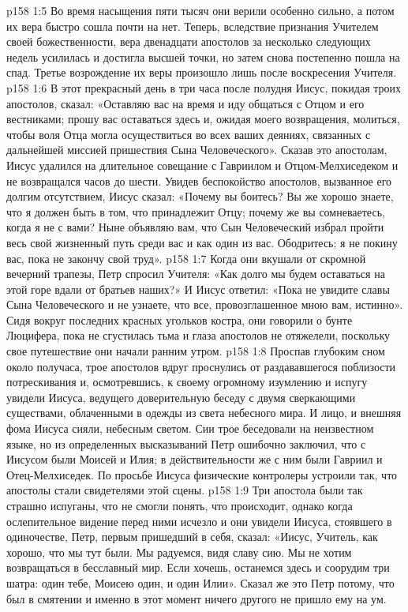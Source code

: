 \vs p158 1:5 Во время насыщения пяти тысяч они верили особенно сильно, а потом их вера быстро сошла почти на нет. Теперь, вследствие признания Учителем своей божественности, вера двенадцати апостолов за несколько следующих недель усилилась и достигла высшей точки, но затем снова постепенно пошла на спад. Третье возрождение их веры произошло лишь после воскресения Учителя.
\vs p158 1:6 В этот прекрасный день в три часа после полудня Иисус, покидая троих апостолов, сказал: «Оставляю вас на время и иду общаться с Отцом и его вестниками; прошу вас оставаться здесь и, ожидая моего возвращения, молиться, чтобы воля Отца могла осуществиться во всех ваших деяниях, связанных с дальнейшей миссией пришествия Сына Человеческого». Сказав это апостолам, Иисус удалился на длительное совещание с Гавриилом и Отцом\hyp{}Мелхиседеком и не возвращался часов до шести. Увидев беспокойство апостолов, вызванное его долгим отсутствием, Иисус сказал: «Почему вы боитесь? Вы же хорошо знаете, что я должен быть в том, что принадлежит Отцу; почему же вы сомневаетесь, когда я не с вами? Ныне объявляю вам, что Сын Человеческий избрал пройти весь свой жизненный путь среди вас и как один из вас. Ободритесь; я не покину вас, пока не закончу свой труд».
\vs p158 1:7 Когда они вкушали от скромной вечерний трапезы, Петр спросил Учителя: «Как долго мы будем оставаться на этой горе вдали от братьев наших?» И Иисус ответил: «Пока не увидите славы Сына Человеческого и не узнаете, что все, провозглашенное мною вам, истинно». Сидя вокруг последних красных угольков костра, они говорили о бунте Люцифера, пока не сгустилась тьма и глаза апостолов не отяжелели, поскольку свое путешествие они начали ранним утром.
\vs p158 1:8 Проспав глубоким сном около получаса, трое апостолов вдруг проснулись от раздававшегося поблизости потрескивания и, осмотревшись, к своему огромному изумлению и испугу увидели Иисуса, ведущего доверительную беседу с двумя сверкающими существами, облаченными в одежды из света небесного мира. И лицо, и внешняя фома Иисуса сияли, небесным светом. Сии трое беседовали на неизвестном языке, но из определенных высказываний Петр ошибочно заключил, что с Иисусом были Моисей и Илия; в действительности же с ним были Гавриил и Отец\hyp{}Мелхиседек. По просьбе Иисуса физические контролеры устроили так, что апостолы стали свидетелями этой сцены.
\vs p158 1:9 Три апостола были так страшно испуганы, что не смогли понять, что происходит, однако когда ослепительное видение перед ними исчезло и они увидели Иисуса, стоявшего в одиночестве, Петр, первым пришедший в себя, сказал: «Иисус, Учитель, как хорошо, что мы тут были. Мы радуемся, видя славу сию. Мы не хотим возвращаться в бесславный мир. Если хочешь, останемся здесь и соорудим три шатра: один тебе, Моисею один, и один Илии». Сказал же это Петр потому, что был в смятении и именно в этот момент ничего другого не пришло ему на ум.
